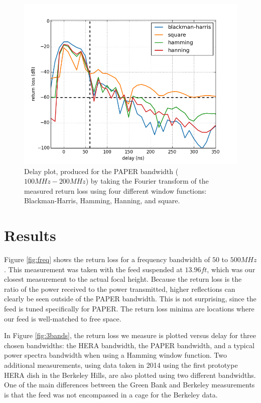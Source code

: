 \documentclass[12pt,preprint]{aastex}
\begin{document}
\begin{figure}[H]
\centering
\includegraphics[totalheight=0.4\textheight]{plots/bh_vs_sq.png}
\caption{Delay plot, produced for the PAPER bandwidth ($100MHz-200MHz$) by taking the Fourier transform of the measured return loss using four different window functions: Blackman-Harris, Hamming, Hanning, and square. }
\label{fig:window}
\end{figure}

\section{Results}

Figure \ref{fig:freq} shows the return loss for a frequency bandwidth of $50$ to
$500MHz$. This measurement was taken with the feed suspended at $13.96ft$, which
was our closest measurement to the actual focal height.  Because the return
loss is the ratio of the power received to the power transmitted, higher
reflections can clearly be seen outside of the PAPER bandwidth. This is not
surprising, since the feed is tuned specifically for PAPER. The return loss
minima are locations where our feed is well-matched to free space.

In Figure \ref{fig:3bands}, the return loss we measure is plotted versus delay for three
chosen bandwidths: the HERA bandwidth, the PAPER bandwidth, and a typical power
spectra bandwidth when using a Hamming window function. Two additional measurements, using data taken in 2014 using the first prototype HERA dish in the Berkeley Hills, are also plotted using two different bandwidths. One of the main differences between the Green Bank and Berkeley measurements is that the feed was not encompassed in a cage for the Berkeley data. 
\end{document}
